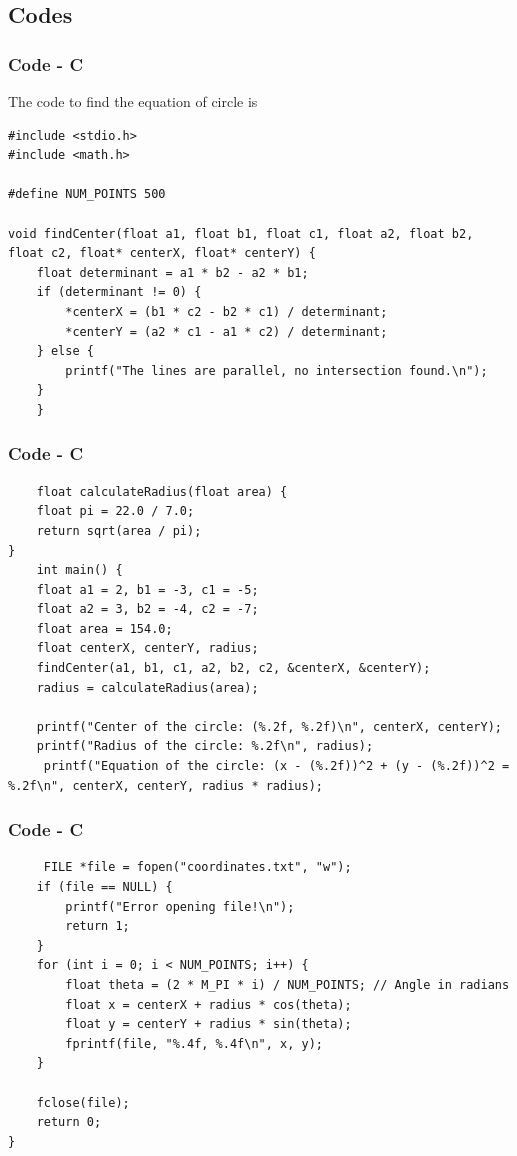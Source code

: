 \documentclass{beamer}
\theoremstyle{remark}
\numberwithin{equation}{section}
\begin{document}
\subsection{Codes}
\begin{frame}[fragile]
    \frametitle{Code - C}
    The code to find the equation of circle is
    \begin{lstlisting}
#include <stdio.h>
#include <math.h>

#define NUM_POINTS 500

void findCenter(float a1, float b1, float c1, float a2, float b2, float c2, float* centerX, float* centerY) {
    float determinant = a1 * b2 - a2 * b1;
    if (determinant != 0) {
        *centerX = (b1 * c2 - b2 * c1) / determinant;
        *centerY = (a2 * c1 - a1 * c2) / determinant;
    } else {
        printf("The lines are parallel, no intersection found.\n");
    }
    }

\end{lstlisting}
\end{frame}
\begin{frame}[fragile]
    \frametitle{Code - C}
    \begin{lstlisting}
    float calculateRadius(float area) {
    float pi = 22.0 / 7.0;
    return sqrt(area / pi);
}
    int main() {
    float a1 = 2, b1 = -3, c1 = -5;   
    float a2 = 3, b2 = -4, c2 = -7;   
    float area = 154.0;               
    float centerX, centerY, radius;
    findCenter(a1, b1, c1, a2, b2, c2, &centerX, &centerY);
    radius = calculateRadius(area);

    printf("Center of the circle: (%.2f, %.2f)\n", centerX, centerY);
    printf("Radius of the circle: %.2f\n", radius);
     printf("Equation of the circle: (x - (%.2f))^2 + (y - (%.2f))^2 = %.2f\n", centerX, centerY, radius * radius);
    \end{lstlisting}
\end{frame}
\begin{frame}[fragile]
    \frametitle{Code - C}
    \begin{lstlisting}
     FILE *file = fopen("coordinates.txt", "w");
    if (file == NULL) {
        printf("Error opening file!\n");
        return 1;
    }
    for (int i = 0; i < NUM_POINTS; i++) {
        float theta = (2 * M_PI * i) / NUM_POINTS; // Angle in radians
        float x = centerX + radius * cos(theta);
        float y = centerY + radius * sin(theta);
        fprintf(file, "%.4f, %.4f\n", x, y);
    }

    fclose(file);
    return 0;
}
    \end{lstlisting}
\end{frame}
\end{document}
